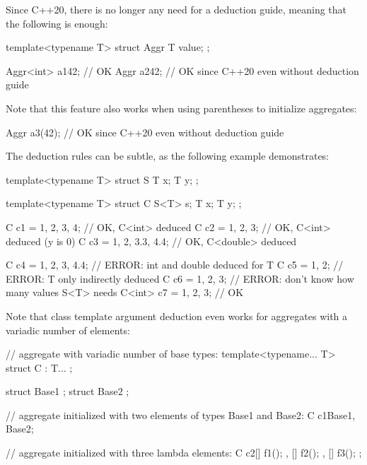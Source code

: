 Since C++20, there is no longer any need for a deduction guide, meaning that the following is enough:

\begin{cpp}
template<typename T>
struct Aggr {
	T value;
};

Aggr<int> a1{42}; // OK
Aggr a2{42}; // OK since C++20 even without deduction guide
\end{cpp}

Note that this feature also works when using parentheses to initialize aggregates:

\begin{cpp}
Aggr a3(42); // OK since C++20 even without deduction guide
\end{cpp}

The deduction rules can be subtle, as the following example demonstrates:

\begin{cpp}
template<typename T>
struct S {
	T x;
	T y;
};

template<typename T>
struct C {
	S<T> s;
	T x;
	T y;
};

C c1 = {{1, 2}, 3, 4}; // OK, C<int> deduced
C c2 = {{1, 2}, 3}; // OK, C<int> deduced (y is 0)
C c3 = {{1, 2}, 3.3, 4.4}; // OK, C<double> deduced

C c4 = {{1, 2}, 3, 4.4}; // ERROR: int and double deduced for T
C c5 = {{1, 2}}; // ERROR: T only indirectly deduced
C c6 = {1, 2, 3}; // ERROR: don’t know how many values S<T> needs
C<int> c7 = {1, 2, 3}; // OK
\end{cpp}

Note that class template argument deduction even works for aggregates with a variadic number of elements:

\begin{cpp}
// aggregate with variadic number of base types:
template<typename... T>
struct C : T... {
};

struct Base1 {
};
struct Base2 {
};

// aggregate initialized with two elements of types Base1 and Base2:
C c1{Base1{}, Base2{}};

// aggregate initialized with three lambda elements:
C c2{[] { f1(); },
	[] { f2(); },
	[] { f3(); }
};
\end{cpp}
















